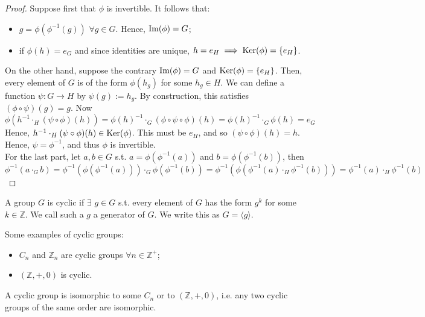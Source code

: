 \documentclass[a4paper]{article}
\begin{document}
\begin{proof}
Suppose first that $\phi$ is invertible. It follows that:
\begin{itemize}
    \item $g=\phi(\phi^{-1}(g))$ $\forall g\in G$. Hence, $\operatorname{Im}(\phi)=G$;
    \item if $\phi(h)=e_G$ and since identities are unique, $h=e_H\implies\operatorname{Ker}(\phi)=\{e_H\}$.
\end{itemize}
On the other hand, suppose the contrary $\operatorname{Im}(\phi)=G$ and $\operatorname{Ker}(\phi)=\{e_H\}$. Then, every element of $G$ is of the form $\phi(h_g)$ for some $h_g\in H$. We can define a function $\psi:G\rightarrow H$ by $\psi(g):=h_g$. By construction, this satisfies $(\phi\circ\psi)(g)=g$. Now
$$\phi(h^{-1}\cdot_H(\psi\circ\phi)(h))=\phi(h)^{-1}\cdot_G(\phi\circ\psi\circ\phi)(h)=\phi(h)^{-1}\cdot_G\phi(h)=e_G$$
Hence, $h^{-1}\cdot_H(\psi\circ\phi)(h)\in\operatorname{Ker}(\phi)$. This must be $e_H$, and so $(\psi\circ\phi)(h)=h$. Hence, $\psi=\phi^{-1}$, and thus $\phi$ is invertible.\\[5pt]
For the last part, let $a,b\in G$ s.t. $a=\phi(\phi^{-1}(a))$ and $b=\phi(\phi^{-1}(b))$, then
$$\phi^{-1}(a\cdot_Gb)=\phi^{-1}(\phi(\phi^{-1}(a)))\cdot_G\phi(\phi^{-1}(b))=\phi^{-1}(\phi(\phi^{-1}(a)\cdot_H\phi^{-1}(b)))=\phi^{-1}(a)\cdot_H\phi^{-1}(b)$$
\end{proof}
\begin{defi}[Cyclic]
A group $G$ is cyclic if $\exists$ $g\in G$ s.t. every element of $G$ has the form $g^k$ for some $k\in\mathbb{Z}$. We call such a $g$ a generator of $G$. We write this as $G=\langle g\rangle$.
\end{defi}
\begin{eg}
Some examples of cyclic groups:
\begin{itemize}
    \item $C_n$ and $\mathbb{Z}_n$ are cyclic groups $\forall n\in\mathbb{Z}^+$;
    \item $(\mathbb{Z},+,0)$ is cyclic.
\end{itemize}
\end{eg}
\begin{thm}
A cyclic group is isomorphic to some $C_n$ or to $(\mathbb{Z},+,0)$, i.e. any two cyclic groups of the same order are isomorphic.
\end{thm}
\end{document}
